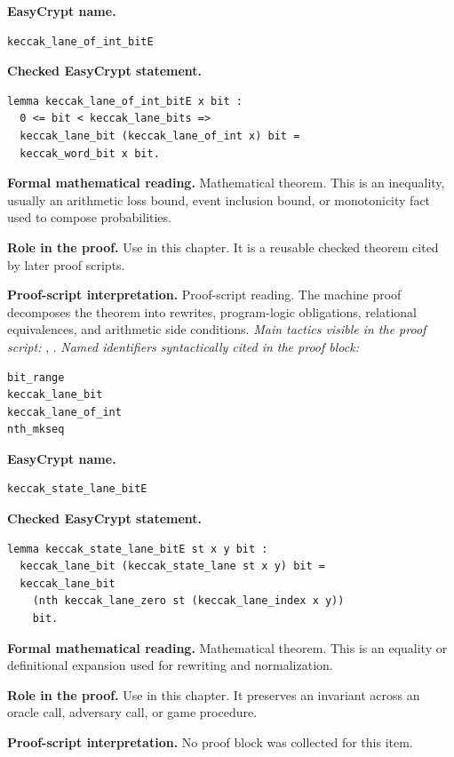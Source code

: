 \begin{formaltheorem}
\noindent\textbf{EasyCrypt name.}
\begin{lstlisting}[language=EasyCrypt,basicstyle=\ttfamily\scriptsize]
keccak_lane_of_int_bitE
\end{lstlisting}
\noindent\textbf{Checked EasyCrypt statement.}
\begin{lstlisting}[language=EasyCrypt,basicstyle=\ttfamily\scriptsize]
lemma keccak_lane_of_int_bitE x bit :
  0 <= bit < keccak_lane_bits =>
  keccak_lane_bit (keccak_lane_of_int x) bit =
  keccak_word_bit x bit.
\end{lstlisting}
\noindent\textbf{Formal mathematical reading.}
Mathematical theorem. This is an inequality, usually an arithmetic loss bound, event inclusion bound, or monotonicity fact used to compose probabilities.

\noindent\textbf{Role in the proof.}
Use in this chapter. It is a reusable checked theorem cited by later proof scripts.

\noindent\textbf{Proof-script interpretation.}
Proof-script reading. The machine proof decomposes the theorem into rewrites, program-logic obligations, relational equivalences, and arithmetic side conditions.
\emph{Main tactics visible in the proof script:} , .
\emph{Named identifiers syntactically cited in the proof block:}
\begin{lstlisting}[language=EasyCrypt,basicstyle=\ttfamily\scriptsize]
bit_range
keccak_lane_bit
keccak_lane_of_int
nth_mkseq
\end{lstlisting}

\end{formaltheorem}

\begin{formaltheorem}
\noindent\textbf{EasyCrypt name.}
\begin{lstlisting}[language=EasyCrypt,basicstyle=\ttfamily\scriptsize]
keccak_state_lane_bitE
\end{lstlisting}
\noindent\textbf{Checked EasyCrypt statement.}
\begin{lstlisting}[language=EasyCrypt,basicstyle=\ttfamily\scriptsize]
lemma keccak_state_lane_bitE st x y bit :
  keccak_lane_bit (keccak_state_lane st x y) bit =
  keccak_lane_bit
    (nth keccak_lane_zero st (keccak_lane_index x y))
    bit.
\end{lstlisting}
\noindent\textbf{Formal mathematical reading.}
Mathematical theorem. This is an equality or definitional expansion used for rewriting and normalization.

\noindent\textbf{Role in the proof.}
Use in this chapter. It preserves an invariant across an oracle call, adversary call, or game procedure.

\noindent\textbf{Proof-script interpretation.}
No proof block was collected for this item.

\end{formaltheorem}

